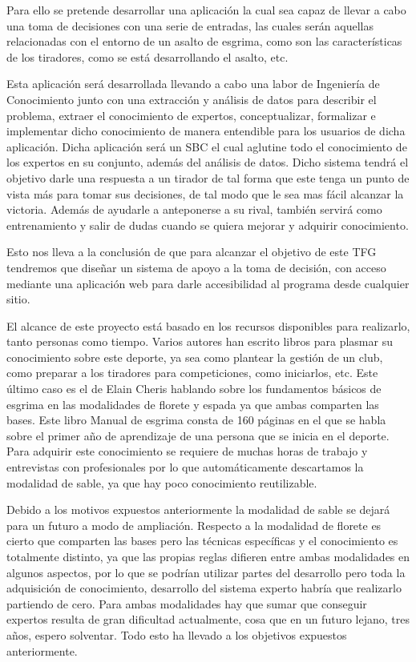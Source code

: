 Para ello se pretende desarrollar una aplicación la cual sea capaz de llevar a
 cabo una toma de decisiones con una serie de entradas, las cuales serán aquellas
 relacionadas con el entorno de un asalto de esgrima, como son las características
 de los tiradores, como se está desarrollando el asalto, etc.

Esta aplicación será desarrollada llevando a cabo una labor de Ingeniería de Conocimiento
 junto con una extracción y análisis de datos para describir el problema, extraer
 el conocimiento de expertos, conceptualizar, formalizar e implementar dicho conocimiento
 de manera entendible para los usuarios de dicha aplicación. Dicha aplicación será un \acf{SBC}
 el cual aglutine todo el conocimiento de los expertos en su conjunto, además del análisis
 de datos. Dicho sistema tendrá el objetivo darle una respuesta a un tirador de tal forma
 que este tenga un punto de vista más para tomar sus decisiones, de tal modo que le sea mas
 fácil alcanzar la victoria. Además de ayudarle a anteponerse a su rival, también servirá
 como entrenamiento y salir de dudas cuando se quiera mejorar y adquirir conocimiento.

Esto nos lleva a la conclusión de que para alcanzar el objetivo de este \acs{TFG} tendremos
 que diseñar un sistema de apoyo a la toma de decisión, con acceso mediante una aplicación
 web para darle accesibilidad al programa desde cualquier sitio.

El alcance de este proyecto está basado en los recursos disponibles para realizarlo, tanto personas como tiempo.
 Varios autores han escrito libros para plasmar su conocimiento sobre este deporte,
 ya sea como plantear la gestión de un club, como preparar a los tiradores para competiciones,
 como iniciarlos, etc. Este último caso es el de Elain Cheris hablando sobre los fundamentos
 básicos de esgrima en las modalidades de florete y espada ya que ambas comparten
 las bases. Este libro Manual de esgrima\cite{manualdeesgrima} consta de 160 páginas en el que se habla sobre
 el primer año de aprendizaje de una persona que se inicia en el deporte. Para adquirir
 este conocimiento se requiere de muchas horas de trabajo y entrevistas con profesionales
 por lo que automáticamente descartamos la modalidad de sable, ya que hay poco conocimiento
 reutilizable.

Debido a los motivos expuestos anteriormente la modalidad de sable se dejará para un futuro
 a modo de ampliación. Respecto a la modalidad de florete es cierto que comparten
 las bases pero las técnicas específicas y el conocimiento es totalmente distinto,
 ya que las propias reglas difieren entre ambas modalidades en algunos aspectos,
 por lo que se podrían utilizar partes del desarrollo pero toda la adquisición de
 conocimiento, desarrollo del sistema experto habría que realizarlo partiendo de cero.
 Para ambas modalidades hay que sumar que conseguir expertos resulta de gran dificultad
 actualmente, cosa que en un futuro lejano, tres años, espero solventar. Todo esto ha
 llevado a los objetivos expuestos anteriormente.

